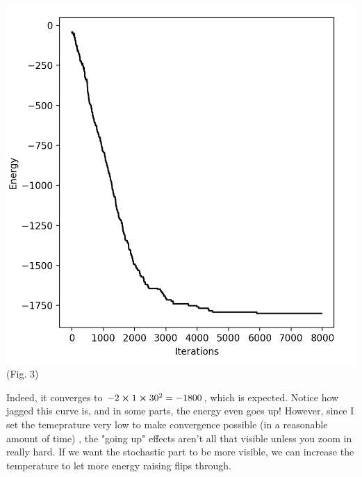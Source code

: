 \documentclass{article}
\begin{document}
\begin{center}
    \includegraphics[scale=.45]{energy_noMag.png}\\ 
    (Fig. 3)
\end{center}
Indeed, it converges to $-2\cross1\cross30^2=-1800$, which is expected. Notice how jagged this curve is, and in some parts, the energy even goes up! However, 
since I set the temeprature very low to make convergence possible (in a reasonable amount of time)
, the "going up" 
effects aren't all that visible unless you zoom in really hard. If we want 
the stochastic part to be more visible, we can increase the temperature to let more energy raising flips through. 
\end{document}
